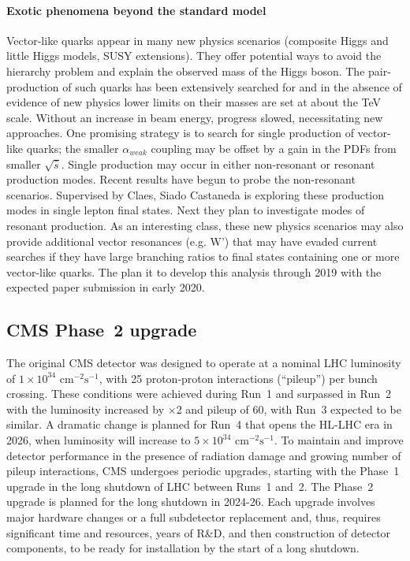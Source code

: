 \paragraph{Exotic phenomena beyond the standard model}
 Vector-like quarks appear in many new physics scenarios (composite Higgs and little Higgs models, SUSY extensions). They offer potential ways to avoid the hierarchy problem and explain the observed mass of the Higgs boson.  The pair-production of such quarks has been extensively searched for and in the absence of evidence of new physics 
 lower limits on their masses are set at about the TeV scale.
 Without an increase in beam energy, progress slowed, necessitating new approaches. One promising strategy is to search for single production of vector-like quarks; the smaller $\alpha_{weak}$ coupling may be offset by a gain in the PDFs from smaller $\sqrt{\hat{s}}$. Single production may occur in either non-resonant or resonant production modes.  Recent results have begun to probe the non-resonant scenarios. Supervised by Claes, Siado Castaneda is exploring these production modes in single lepton final states. 
 Next they plan to investigate modes of resonant production.
 As an interesting class, these new physics scenarios may also provide additional vector resonances (e.g. W’) that may have evaded current searches if they have large branching ratios to final states containing one or more vector-like quarks. The plan it to develop this analysis through 2019 with the expected paper submission in early 2020.

\subsection{CMS Phase~2 upgrade}


The original CMS detector was designed to operate at a nominal LHC luminosity of $1\!\times\! 10^{34}\textrm{ cm}^{-2}\textrm{s}^{-1}$, with 25 proton-proton interactions (``pileup'') per bunch crossing. These conditions were achieved during Run~1 and surpassed in Run~2 with the luminosity increased by $\times$2 and pileup of 60, with Run~3 expected to be similar. A dramatic change is planned for Run~4 that opens the HL-LHC era in 2026, when luminosity will increase to $5\!\times\! 10^{34}\textrm{ cm}^{-2}\textrm{s}^{-1}$. To maintain and improve detector performance in the presence of radiation damage and growing number of pileup interactions, CMS undergoes periodic upgrades, starting with the Phase~1 upgrade in the long shutdown of LHC between Runs~1 and~2. The Phase~2 upgrade is planned for the long shutdown in 2024-26. Each upgrade involves major hardware changes or a full subdetector replacement and, thus, requires significant time and resources, years of R\&D, and then construction of detector components, to be ready for installation by the start of a long shutdown.


